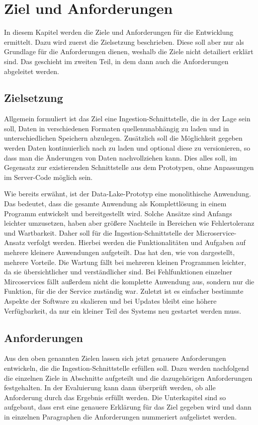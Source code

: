 \chapter{Ziel und Anforderungen}
In diesem Kapitel werden die Ziele und Anforderungen für die Entwicklung ermittelt.
Dazu wird zuerst die Zielsetzung beschrieben.
Diese soll aber nur als Grundlage für die Anforderungen dienen, weshalb die Ziele nicht detailiert erklärt sind.
Das geschieht im zweiten Teil, in dem dann auch die Anforderungen abgeleitet werden.

\section{Zielsetzung}
Allgemein formuliert ist das Ziel eine Ingestion-Schnittstelle, die in der Lage sein soll, Daten in verschiedenen Formaten quellenunabhängig zu laden und in unterschiedlichen Speichern abzulegen.
Zusätzlich soll die Möglichkeit gegeben werden Daten kontinuierlich nach zu laden und optional diese zu versionieren, so dass man die Änderungen von Daten nachvollziehen kann.
Dies alles soll, im Gegensatz zur existierenden Schnittstelle aus dem Prototypen, ohne Anpassungen im Server-Code möglich sein.

Wie bereits erwähnt, ist der Data-Lake-Prototyp eine monolithische Anwendung.
Das bedeutet, dass die gesamte Anwendung als Komplettlösung in einem Programm entwickelt und bereitgestellt wird.
Solche Ansätze sind Anfangs leichter umzusetzen, haben aber größere Nachteile in Bereichen wie Fehlertoleranz und Wartbarkeit.
Daher soll für die Ingestion-Schnittstelle der Microservice-Ansatz verfolgt werden.
Hierbei werden die Funktionalitäten und Aufgaben auf mehrere kleinere Anwendungen aufgeteilt.
Das hat den, wie von \textcite{microservices} dargestellt, mehrere Vorteile.
Die Wartung fällt bei mehreren kleinen Programmen leichter, da sie übersichtlicher und verständlicher sind.
Bei Fehlfunktionen einzelner Mircoservices fällt außerdem nicht die komplette Anwendung aus, sondern nur die Funktion, für die der Service zuständig war.
Zuletzt ist es einfacher bestimmte Aspekte der Software zu skalieren und bei Updates bleibt eine höhere Verfügbarkeit, da nur ein kleiner Teil des Systems neu gestartet werden muss.

\section{Anforderungen}
Aus den oben genannten Zielen lassen sich jetzt genauere Anforderungen entwickeln, die die Ingestion-Schnittstelle erfüllen soll.
Dazu werden nachfolgend die einzelnen Ziele in Abschnitte aufgeteilt und die dazugehörigen Anforderungen festgehalten.
In der Evaluierung kann dann überprüft werden, ob alle Anforderung durch das Ergebnis erfüllt werden.
Die Unterkapitel sind so aufgebaut, dass erst eine genauere Erklärung für das Ziel gegeben wird und dann in einzelnen Paragraphen die Anforderungen nummeriert aufgelistet werden.

